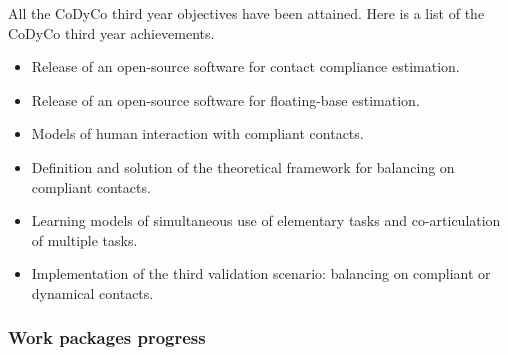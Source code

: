 \documentclass[12pt,a4paper,twoside]{article}
\begin{document}
All the CoDyCo third year objectives have been attained. Here is a list of the CoDyCo third year
achievements. \begin{itemize}

\item Release of an open-source software for contact compliance estimation.

\item Release of an open-source software for floating-base estimation.

\item Models of human interaction with compliant contacts.

\item Definition and solution of the theoretical framework for balancing on compliant contacts.

\item Learning models of simultaneous use of elementary tasks and co-articulation of multiple tasks.

\item Implementation of the third validation scenario: balancing on compliant or dynamical contacts.

\end{itemize}

\subsubsection{Work packages progress}





























\end{document}
